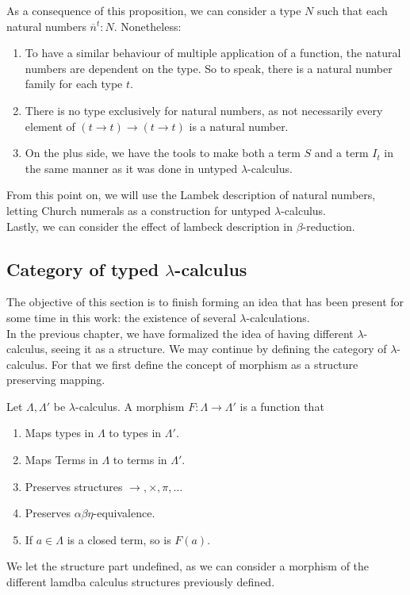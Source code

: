 As a consequence of this proposition, we can consider a type $N$ such that each natural numbers $\overline n^t:N$. Nonetheless:
\begin{enumerate}

\item To have a similar behaviour of multiple application of a function, the natural numbers are dependent on the type. So to speak, there is a natural number family for each type $t$.
\item There is no type exclusively for natural numbers, as not necessarily every element of $(t\to t)\to(t\to t)$ is a natural number.
\item On the plus side, we have the tools to make both a term $S$ and a term $I_t$ in the same manner as it was done in untyped $\lambda$-calculus. \\
\end{enumerate}
From this point on, we will use the Lambek description of natural numbers, letting Church numerals as a construction for untyped $\lambda$-calculus.\\

Lastly, we can consider the effect of lambeck description in $\beta$-reduction.

\subsection{Category of typed $\lambda$-calculus}

The objective of this section is to finish forming an idea that has been present for some time in this work: the existence of several $\lambda$-calculations. \\

In the previous chapter, we have formalized the idea of having different $\lambda$-calculus, seeing it as a structure. We may continue by defining the category of $\lambda$-calculus. For that we first define the concept of morphism as a structure preserving mapping.



\begin{definition}
  Let $\Lambda, \Lambda '$ be $\lambda$-calculus. A morphism $F: \Lambda \to \Lambda '$ is a function that
  \begin{enumerate}
  \item Maps types in $\Lambda$ to types in $\Lambda '$.
  \item Maps Terms in $\Lambda$ to terms in $\Lambda '$.
  \item Preserves structures $\to, \times, \pi, ...$
  \item Preserves $\alpha\beta\eta$-equivalence.
  \item If $a\in \Lambda$ is a closed term, so is $F(a)$.
\end{enumerate}
\end{definition}
\begin{remark}
We let the structure part undefined, as we can consider a morphism of the different lamdba calculus structures previously defined.
\end{remark}


